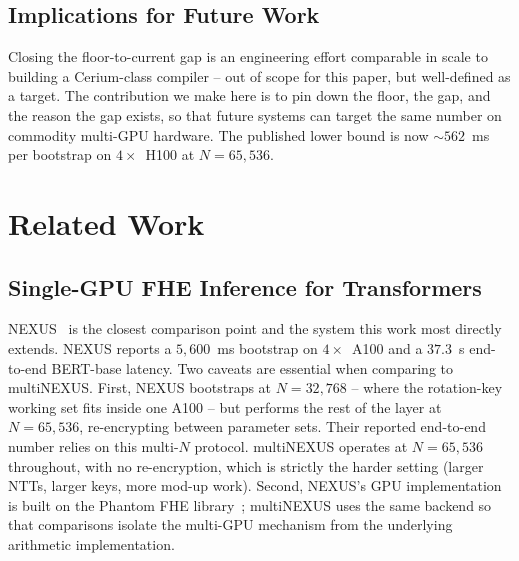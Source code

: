 \documentclass[conference]{IEEEtran}
\begin{document}
\subsection{Implications for Future Work}

Closing the floor-to-current gap is an engineering effort comparable
in scale to building a Cerium-class compiler -- out of scope for this
paper, but well-defined as a target. The contribution we make here is
to pin down the floor, the gap, and the reason the gap exists, so that
future systems can target the same number on commodity multi-GPU
hardware. The published lower bound is now $\sim 562$~ms per bootstrap
on $4\times$~H100 at $N{=}65{,}536$.

\section{Related Work}
\label{sec:related}

\subsection{Single-GPU FHE Inference for Transformers}
NEXUS~\cite{Zhang2025} is the closest comparison point and the system
this work most directly extends. NEXUS reports a $5{,}600$~ms bootstrap
on $4\times$~A100 and a $37.3$~s end-to-end BERT-base latency. Two
caveats are essential when comparing to multiNEXUS. First, NEXUS
bootstraps at $N{=}32{,}768$ -- where the rotation-key working set fits
inside one A100 -- but performs the rest of the layer at
$N{=}65{,}536$, re-encrypting between parameter sets. Their reported
end-to-end number relies on this multi-$N$ protocol. multiNEXUS
operates at $N{=}65{,}536$ throughout, with no re-encryption, which is
strictly the harder setting (larger NTTs, larger keys, more mod-up
work). Second, NEXUS's GPU implementation is built on the Phantom FHE
library~\cite{Phantom_FHE}; multiNEXUS uses the same backend so that
comparisons isolate the multi-GPU mechanism from the underlying
arithmetic implementation.
\end{document}
